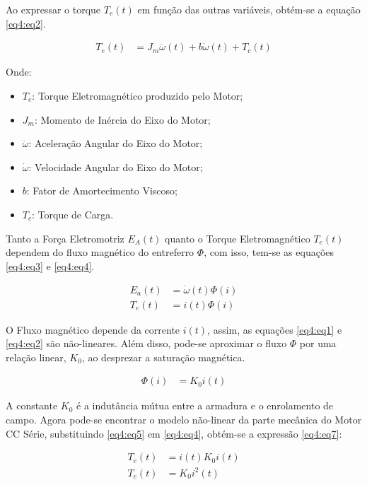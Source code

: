 Ao expressar o torque $T_e(t)$ em função das outras variáveis, obtém-se a equação \ref{eq4:eq2}.

\begin{align}
	T_e(t) &= J_m\ddot{\omega}(t) + b\dot{\omega}(t) + T_c(t) \label{eq4:eq2}
\end{align}


\noindent Onde:
\begin{itemize}
        \setlength{\itemsep}{-2pt}
	\item $T_e$: Torque Eletromagnético produzido pelo Motor;
	\item $J_m$: Momento de Inércia do Eixo do Motor;
	\item $\ddot{\omega}$: Aceleração Angular do Eixo do Motor;
	\item $\dot{\omega}$: Velocidade Angular do Eixo do Motor;
	\item $b$: Fator de Amortecimento Viscoso;
	\item $T_c$: Torque de Carga.
\end{itemize}

Tanto a Força Eletromotriz $E_A(t)$ quanto o Torque Eletromagnético $T_e(t)$ dependem do fluxo magnético do entreferro $\Phi$, com isso, tem-se as equações \ref{eq4:eq3} e \ref{eq4:eq4}.

\begin{align}
	E_a(t) &= \dot{\omega}(t) \Phi{(i)} \label{eq4:eq3}\\
	T_e(t) &= i(t) \Phi{(i)}			\label{eq4:eq4}
\end{align}

O Fluxo magnético depende da corrente $i(t)$, assim, as equações \ref{eq4:eq1} e \ref{eq4:eq2} são não-lineares. Além disso, pode-se aproximar o fluxo $\Phi$ por uma relação linear, $K_0$, ao desprezar a saturação magnética.

\begin{align}
	\Phi(i) &= K_0 i(t) \label{eq4:eq5}
\end{align}

A constante $K_0$ é a indutância mútua entre a armadura e o enrolamento de campo. Agora pode-se encontrar o modelo não-linear da parte mecânica do Motor CC Série, substituindo \ref{eq4:eq5} em \ref{eq4:eq4}, obtém-se a expressão \ref{eq4:eq7}:

\begin{align}
	T_e(t) &= i(t) K_0 i(t) \label{eq4:eq6}\\
	T_e(t) &= K_0 i^2(t) 	\label{eq4:eq7}
\end{align}

